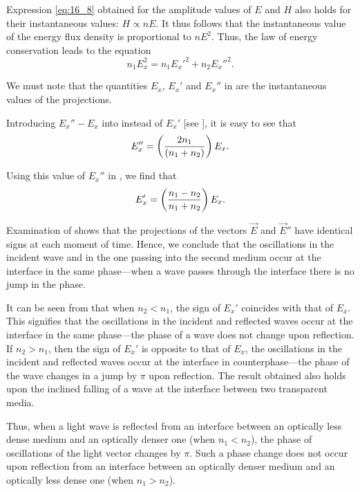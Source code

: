 Expression \eqref{eq:16_8} obtained for the amplitude values of $E$ and $H$ also holds for their instantaneous values: $H \propto nE$.
It thus follows that the instantaneous value of the energy flux density is proportional to $nE^2$.
Thus, the law of energy conservation leads to the equation
\begin{equation}\label{eq:16_29}
    n_1 E_x^2 = n_1 E_x'^2 + n_2 E_x''^2.
\end{equation}

\noindent
We must note that the quantities $E_x$, $E_x'$ and $E_x''$ in  are the instantaneous values of the projections.

Introducing $E_x''-E_x$ into  instead of $E_x'$ [see ], it is easy to see that
\begin{equation}\label{eq:16_30}
    E_x'' = \left(\frac{2 n_1}{(n_1 + n_2)}\right) E_x.
\end{equation}

\noindent
Using this value of $E_x''$ in , we find that
\begin{equation}\label{eq:16_31}
    E_x' = \left(\frac{n_1 - n_2}{n_1 + n_2}\right) E_x.
\end{equation}

Examination of  shows that the projections of the vectors $\vec{E}$ and $\vec{E}''$ have identical signs at each moment of time.
Hence, we conclude that the oscillations in the incident wave and in the one passing into the second medium occur at the interface in the same phase---when a wave passes through the interface there is no jump in the phase.

It can be seen from  that when $n_2 < n_1$, the sign of $E_x'$ coincides with that of $E_x$.
This signifies that the oscillations in the incident and reflected waves occur at the interface in the same phase---the phase of a wave does not change upon reflection.
If $n_2 > n_1$, then the sign of $E_x'$ is opposite to that of $E_x$, the oscillations in the incident and reflected waves occur at the interface in counterphase---the phase of the wave changes in a jump by $\pi$ upon reflection.
The result obtained also holds upon the inclined falling of a wave at the interface between two transparent media.

Thus, when a light wave is reflected from an interface between an optically less dense medium and an optically denser one (when $n_1 < n_2$), the phase of oscillations of the light vector changes by $\pi$.
Such a phase change does not occur upon reflection from an interface between an optically denser medium and an optically less dense one (when $n_1 > n_2$).

